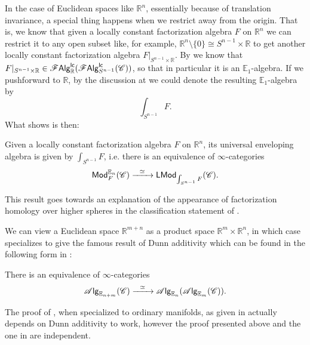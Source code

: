\documentclass[../text]{subfiles}
\begin{document}
\begin{remark}
    In the case of Euclidean spaces like $\mathbb{R}^n$, essentially because of translation invariance, a special thing happens when we restrict away from the origin. That is, we know that given a locally constant factorization algebra $F$ on $\mathbb{R}^n$ we can restrict it to any open subset like, for example, $\mathbb{R}^n \setminus \{ 0 \} \cong S^{n-1} \times \mathbb{R}$ to get another locally constant factorization algebra $F|_{S^{n-1} \times \mathbb{R}}$. By  we know that $F|_{S^{n-1} \times \mathbb{R}} \in \mathscr{F} \mathsf{Alg}^{\mathsf{lc}}_{\mathbb{R}} (\mathscr{F} \mathsf{Alg}^{\mathsf{lc}}_{S^{n-1}} (\mathscr{C}))$, so that in particular it is an $\mathbb{E}_1$-algebra. If we pushforward to $\mathbb{R}$, by the discussion at  we could denote the resulting $\mathbb{E}_1$-algebra by
    \begin{equation}
        \int_{S^{n-1}} F.
    \end{equation}
    What \cite[prop.3.16]{francis2013} shows is then:

    \begin{proposition}\label{univ_env_for_En}
        Given a locally constant factorization algebra $F$ on $\mathbb{R}^n$, its universal enveloping algebra is given by $\int_{S^{n-1}} F$, i.e. there is an equivalence of $\infty$-categories
        \begin{equation}
            \mathsf{Mod}^{\mathbb{E}_n}_{F} (\mathscr{C}) \xrightarrow{\ \ \simeq \ \ } \mathsf{LMod}_{\int_{S^{n-1}} F} (\mathscr{C}).
        \end{equation}
    \end{proposition}
    This result goes towards an explanation of the appearance of factorization homology over higher spheres in the classification statement of .
\end{remark}

We can view a Euclidean space $\mathbb{R}^{m+n}$ as a product space $\mathbb{R}^m \times \mathbb{R}^n$, in which case  specializes to give the famous result of Dunn additivity \cite{dunn1988} which can be found in the following form in \cite{lurie_ha}:

\begin{proposition}\label{prop:dunn_additivity}
    There is an equivalence of $\infty$-categories
    \begin{equation}
        \mathscr{A} \mathsf{lg}_{\mathbb{E}_{n + m}} (\mathscr{C}) \xrightarrow{\ \ \simeq \ \ } \mathscr{A} \mathsf{lg}_{\mathbb{E}_n} (\mathscr{A} \mathsf{lg}_{\mathbb{E}_m} (\mathscr{C})). 
    \end{equation}
\end{proposition}

\begin{remark}
    The proof of , when specialized to ordinary manifolds, as given in \cite{ginot2015} actually depends on Dunn additivity to work, however the proof presented above and the one in \cite{lurie_ha} are independent. 
\end{remark}
\end{document}
